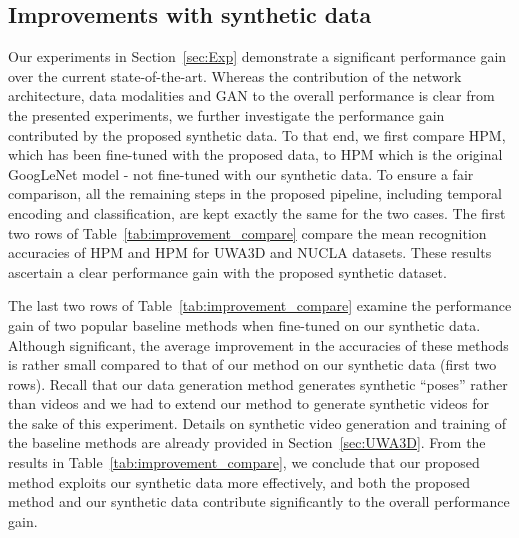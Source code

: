 \documentclass[twocolumn]{svjour3}          \smartqed  \usepackage{graphicx}
\begin{document}
\subsection{Improvements with synthetic data}
Our experiments in Section~\ref{sec:Exp} demonstrate a significant performance gain over the current state-of-the-art. Whereas the contribution of the network architecture, data modalities and GAN to the overall performance is clear from the presented experiments, we further investigate the performance gain contributed by the proposed synthetic data. To that end, we  first compare HPM, which has been fine-tuned with the proposed data, to HPM which is the original GoogLeNet model  - not fine-tuned with our synthetic data. To ensure a fair comparison, all the remaining steps in the proposed pipeline, including  temporal encoding and classification, are kept exactly the same for the two cases.  The first two rows of Table~\ref{tab:improvement_compare} compare the mean recognition accuracies of  HPM and HPM for  UWA3D and NUCLA datasets. 
These results ascertain a clear performance gain with the proposed synthetic dataset.

The last two rows of Table~\ref{tab:improvement_compare} examine the performance gain of two popular  baseline methods when fine-tuned on our synthetic data. Although significant, the average  improvement in the accuracies of these methods is rather small compared to that of our method on our synthetic data (first two rows). Recall that our data generation method generates synthetic ``poses'' rather than videos and we had to extend our method to generate synthetic videos for the sake of this experiment. 
Details on synthetic video generation and training of the baseline methods are already provided in Section~\ref{sec:UWA3D}. 
From the results in Table~\ref{tab:improvement_compare}, we conclude that our proposed method exploits our synthetic data more effectively, and both the proposed method and our synthetic data contribute significantly to the overall performance gain.
\end{document}
